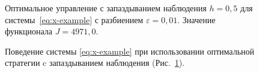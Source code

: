 \begin{figure}[bh]
        \noindent{}
        \caption{Оптимальное управление с запаздыванием наблюдения $h = 0,\!5$ для системы~\eqref{eq:x-example} с разбиением $\varepsilon = 0,\!01$. Значение функционала $J = 4971,\!0$.}
        \label{img:small-control}
\end{figure}
\begin{figure}[bh]
        \noindent{}
        \caption{Поведение системы \eqref{eq:x-example} при использовании оптимальной стратегии c запаздыванием наблюдения (Рис.~\ref{img:small-control}).}
        \label{img:small-tr}
\end{figure}
